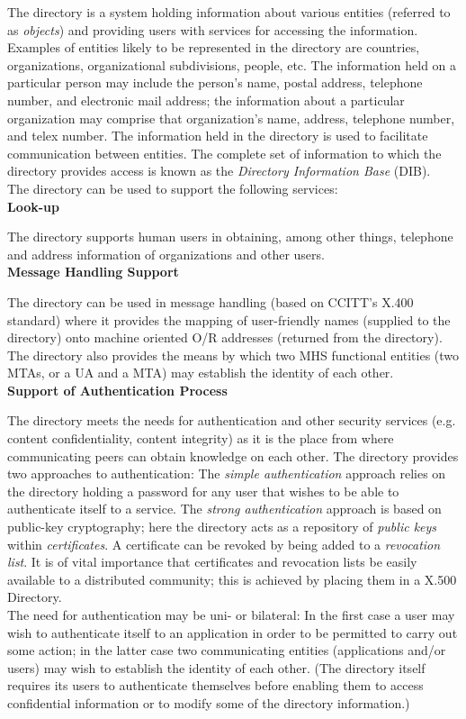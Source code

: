 The directory is a system holding information about various entities
(referred to as {\em objects}) and providing users with services for
accessing the information. Examples of entities likely to be
represented in the directory are countries, organizations,
organizational subdivisions, people, etc.
The information held on a particular person may include the
person's name, postal address, telephone number, and electronic mail
address; the information about a particular organization may
comprise that organization's name, address, telephone number, and
telex number.
The information held in the directory is used to facilitate communication
between entities.
The complete set of information to which the directory provides
access is known as the {\em Directory Information Base} (DIB).
\\ [1em]
The directory can be used to support the following services:
\\ [1em]
{\bf Look-up}

The directory supports human users in obtaining, among other things,
telephone and address information of organizations and other users.
\\ [1em]
{\bf Message Handling Support}

The directory can be used in message handling (based on CCITT's
X.400 standard) where it provides the mapping of user-friendly names
(supplied to the directory) onto machine oriented O/R addresses
(returned from the directory). The directory also provides the means
by which two MHS functional entities (two MTAs, or a UA and a MTA)
may establish the identity of each other.
\\ [1em]
{\bf Support of Authentication Process}

The directory meets the needs for authentication and other security
services (e.g. content confidentiality, content integrity) as it is the
place from where communicating peers can obtain
knowledge on each other. The directory provides two approaches to
authentication:
\bi
\m The {\em simple authentication} approach relies on the directory holding
a password for any user that wishes to be able to authenticate itself
to a service.
\m The {\em strong authentication} approach is based on public-key
cryptography; here the directory acts as a repository of {\em public keys}
within {\em certificates}.
\ei
A certificate can be revoked by being added to a
{\em revocation list}.
It is of vital importance that certificates and revocation lists be
easily available to a distributed community; this is achieved by placing
them in a X.500 Directory.
\\ [1ex]
The need for authentication may be uni- or bilateral: In the first case
a user may wish to authenticate itself to an application in order
to be permitted to carry out some action; in the latter case two
communicating entities (applications and/or users) may wish to establish
the identity of each other.
(The directory itself requires its users to
authenticate themselves before enabling them to access confidential
information or to modify some of the directory information.)


